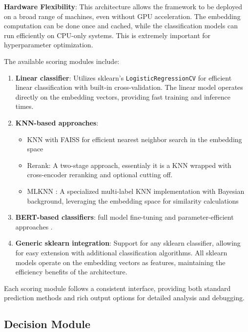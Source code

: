 \textbf{Hardware Flexibility}: This architecture allows the framework to be deployed on a broad range of machines, even without GPU acceleration. The embedding computation can be done once and cached, while the classification models can run efficiently on CPU-only systems. This is extremely important for hyperparameter optimization.

The available scoring modules include:

\begin{enumerate}
    \item \textbf{Linear classifier}: Utilizes sklearn's \texttt{LogisticRegressionCV} \cite{pedregosa2018scikitlearnmachinelearningpython} for efficient linear classification with built-in cross-validation. The linear model operates directly on the embedding vectors, providing fast training and inference times.
    
    \item \textbf{KNN-based approaches}:
    \begin{itemize}
        \item KNN with FAISS \cite{douze2024faiss} for efficient nearest neighbor search in the embedding space
        \item Rerank: A two-stage approach, essentialy it is a KNN wrapped with cross-encoder reranking and optional cutting off.
        \item MLKNN \cite{zhang2007ml}: A specialized multi-label KNN implementation with Bayesian background, leveraging the embedding space for similarity calculations
    \end{itemize}
    
    \item \textbf{BERT-based classifiers}: full model fine-tuning \cite{devlin2019bertpretrainingdeepbidirectional} and parameter-efficient approaches \cite{hu2021loralowrankadaptationlarge,liu2023gptunderstands}.
    
    \item \textbf{Generic sklearn integration}: Support for any sklearn classifier, allowing for easy extension with additional classification algorithms. All sklearn models operate on the embedding vectors as features, maintaining the efficiency benefits of the architecture.
\end{enumerate}

Each scoring module follows a consistent interface, providing both standard prediction methods and rich output options for detailed analysis and debugging.

\subsection{Decision Module}

